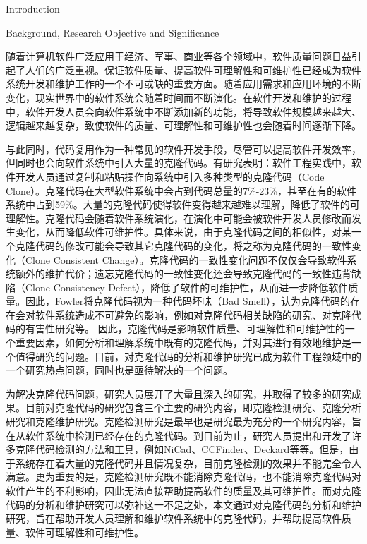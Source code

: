 
{Introduction}

{Background, Research Objective and Significance}

随着计算机软件广泛应用于经济、军事、商业等各个领域中，软件质量问题日益引起了人们的广泛重视。保证软件质量、提高软件可理解性和可维护性已经成为软件系统开发和维护工作的一个不可或缺的重要方面。随着应用需求和应用环境的不断变化，现实世界中的软件系统会随着时间而不断演化。在软件开发和维护的过程中，软件开发人员会向软件系统中不断添加新的功能，将导致软件规模越来越大、逻辑越来越复杂，致使软件的质量、可理解性和可维护性也会随着时间逐渐下降。

与此同时，代码复用作为一种常见的软件开发手段，尽管可以提高软件开发效率，但同时也会向软件系统中引入大量的克隆代码。有研究表明：软件工程实践中，软件开发人员通过复制和粘贴操作向系统中引入多种类型的克隆代码（Code Clone）\cite{roy2007survey}。克隆代码在大型软件系统中会占到代码总量的7\%-23\%\cite{baker1995finding,kontogiannis1996pattern,lague1997assessing}，甚至在有的软件系统中占到59\%\cite{ducasse1999language}。大量的克隆代码使得软件变得越来越难以理解，降低了软件的可理解性。克隆代码会随着软件系统演化，在演化中可能会被软件开发人员修改而发生变化，从而降低软件可维护性。具体来说，由于克隆代码之间的相似性，对某一个克隆代码的修改可能会导致其它克隆代码的变化，将之称为克隆代码的一致性变化（Clone Consistent Change）。克隆代码的一致性变化问题不仅仅会导致软件系统额外的维护代价；遗忘克隆代码的一致性变化还会导致克隆代码的一致性违背缺陷（Clone Consistency-Defect），降低了软件的可维护性，从而进一步降低软件质量。因此，Fowler将克隆代码视为一种代码坏味（Bad Smell）\cite{fowler2009refactoring}，认为克隆代码的存在会对软件系统造成不可避免的影响，例如对克隆代码相关缺陷的研究\cite{juergens2009code,gauthier2013uncovering,wagner2016relationship}、对克隆代码的有害性研究\cite{kapser2008cloning,selim2010studying,wang2012can}等。
因此，克隆代码是影响软件质量、可理解性和可维护性的一个重要因素，如何分析和理解系统中既有的克隆代码，并对其进行有效地维护是一个值得研究的问题。目前，对克隆代码的分析和维护研究已成为软件工程领域中的一个研究热点问题，同时也是亟待解决的一个问题。

为解决克隆代码问题，研究人员展开了大量且深入的研究，并取得了较多的研究成果。目前对克隆代码的研究包含三个主要的研究内容，即克隆检测研究、克隆分析研究和克隆维护研究。克隆检测研究是最早也是研究最为充分的一个研究内容，旨在从软件系统中检测已经存在的克隆代码。到目前为止，研究人员提出和开发了许多克隆代码检测的方法和工具，例如NiCad\cite{roy2008nicad}、CCFinder\cite{kamiya2002ccfinder}、Deckard\cite{jiang2007deckard}等等。但是，由于系统存在着大量的克隆代码并且情况复杂，目前克隆检测的效果并不能完全令人满意。更为重要的是，克隆检测研究既不能消除克隆代码，也不能消除克隆代码对软件产生的不利影响，因此无法直接帮助提高软件的质量及其可维护性。而对克隆代码的分析和维护研究可以弥补这一不足之处，本文通过对克隆代码的分析和维护研究，旨在帮助开发人员理解和维护软件系统中的克隆代码，并帮助提高软件质量、软件可理解性和可维护性。

